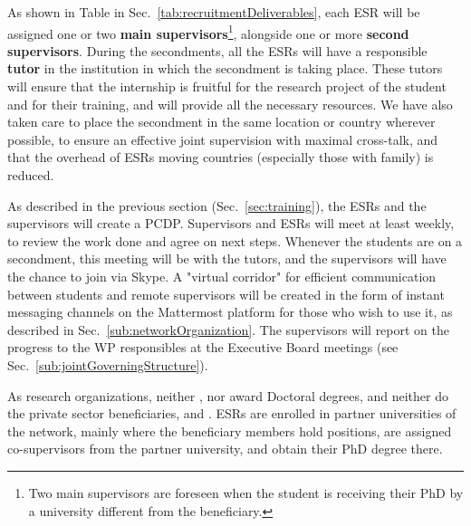 As shown in Table in Sec.~\ref{tab:recruitmentDeliverables},
each ESR will be assigned one or two \textbf{main supervisors}\footnote{Two main supervisors
are foreseen when the student is receiving their PhD by a university different from the beneficiary.},
alongside one or more \textbf{second supervisors}. 
During the secondments, all the ESRs will have a responsible \textbf{tutor} in
the institution in which the secondment is taking place. These tutors
will ensure that the internship is fruitful for the research project
of the student and for their training, and will provide all the necessary
resources. 
We have also taken care to place the secondment in 
the same location or country wherever possible, to ensure an effective joint supervision 
with maximal cross-talk, and that the overhead of ESRs moving countries (especially those with family) is reduced. 

As described in the previous section (Sec.~\ref{sec:training}), the ESRs and the supervisors
will create a PCDP. Supervisors and ESRs will meet at least weekly, to review the work done and agree on next steps. 
Whenever the students are on a secondment, this meeting will be with the tutors, and the supervisors
will have the chance to join via Skype. 
A "virtual corridor" for efficient communication between
students and remote supervisors will be created in the form of 
instant messaging channels on the Mattermost platform for those who wish to use it,
as described in Sec.~\ref{sub:networkOrganization}. 
The supervisors will report on the progress to the WP responsibles
at the Executive Board meetings (see Sec.~\ref{sub:jointGoverningStructure}). 

As research organizations, neither \cernentity, nor \nikhefentity award
Doctoral degrees, and neither do the private
sector beneficiaries, \dqentity and \ibmentity. ESRs are enrolled in partner
universities of the network, mainly where the beneficiary members 
hold positions, are assigned co-supervisors from the partner university,
and obtain their PhD degree there. 

